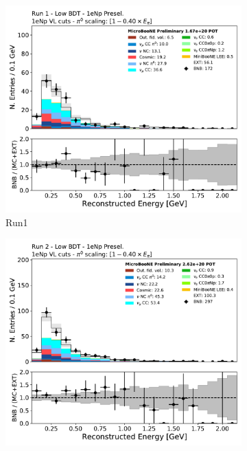 \begin{figure}[H]
    \begin{center}
    \begin{subfigure}{0.32\textwidth}
    \includegraphics[width=1.00\textwidth]{Sidebands/Figures/1eNp/TimeDependence/reco_e_LPID_NPVL_Run1.pdf}
    \caption{Run1}
    \end{subfigure}
    \begin{subfigure}{0.32\textwidth}
    \includegraphics[width=1.00\textwidth]{Sidebands/Figures/1eNp/TimeDependence/reco_e_LPID_NPVL_Run2.pdf}

\end{subfigure}
\end{center}
\end{figure}
